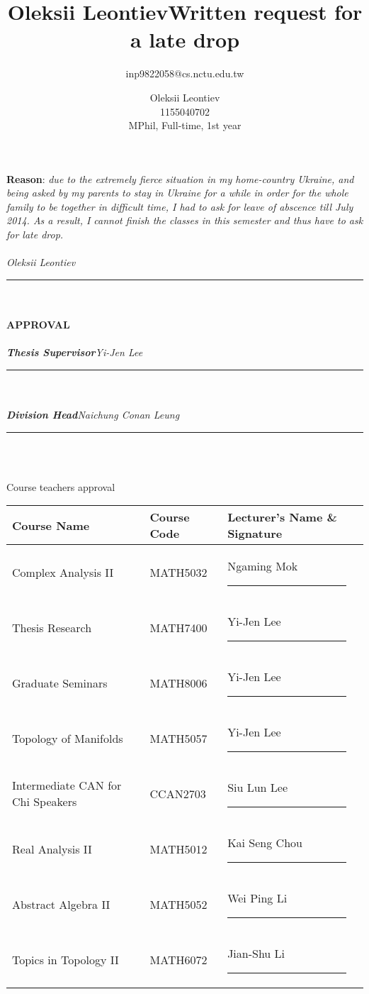 \documentclass[10pt]{article}
\title{\bfseries\Huge Oleksii Leontiev}
\author{inp9822058@cs.nctu.edu.tw}
\date{}
\title{Written request for a late drop}
\author{Oleksii Leontiev\\1155040702\\MPhil, Full-time, 1st year}
\begin{document}
\maketitle
\textbf{Reason}:\textit{ due to the extremely fierce situation in my home-country Ukraine, and being asked by my parents to
stay in Ukraine for a while in order for the whole family to be together in difficult time, I had to ask for leave of abscence
till July 2014. As a result, I cannot finish the classes in this semester and thus have to ask for late drop.}\\\\
{\it Oleksii Leontiev}\quad\rule{4cm}{1pt}\\\\
\textbf{APPROVAL}\\\\
{\it\bf Thesis Supervisor\quad}{\it Yi-Jen Lee}\quad\rule{4cm}{1pt}\\\\
{\it\bf Division Head\quad}{\it Naichung Conan Leung}\quad\rule{4cm}{1pt}\\\\
\begin{center}
	Course teachers approval
\begin{tabular}{|m{}|m{}|b{}|@{}m{0cm}@{}}
	\hline
	Course Name & Course Code & Lecturer's Name \& Signature&\\\hline
	Complex Analysis II & MATH5032 & Ngaming Mok\quad\rule{4cm}{1pt}&\\[6ex]\hline
	Thesis Research & MATH7400 & Yi-Jen Lee \quad\rule{4cm}{1pt}&\\[6ex]\hline
	Graduate Seminars & MATH8006 & Yi-Jen Lee \quad\rule{4cm}{1pt}&\\[6ex]\hline
	Topology of Manifolds & MATH5057 & Yi-Jen Lee\quad\rule{4cm}{1pt}&\\[6ex]\hline
	Intermediate CAN for Chi Speakers & CCAN2703 & Siu Lun Lee \quad\rule{4cm}{1pt}&\\[6ex]\hline
	Real Analysis II & MATH5012 & Kai Seng Chou \quad\rule{4cm}{1pt}&\\[6ex]\hline
	Abstract Algebra II & MATH5052 & Wei Ping Li \quad\rule{4cm}{1pt}&\\[6ex]\hline
	Topics in Topology II & MATH6072 & Jian-Shu Li  \quad\rule{4cm}{1pt}&\\[6ex]\hline
\end{tabular}
\end{center}
\end{document}
